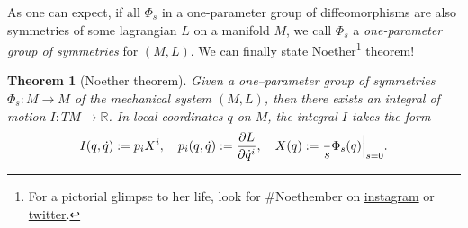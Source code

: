 \documentclass[english,fontsize=11pt,paper=a5,oneside]{scrbook}
\newcommand{\R}{\mathbb{R}}
\let\d\relax
\newcommand{\d}{\mathrm{d}}
\newtheorem{theorem}{Theorem}[chapter]
\theoremstyle{definition}
\begin{document}
As one can expect, if all $\Phi_s$ in a one-parameter group of diffeomorphisms are also symmetries of some lagrangian $L$ on a manifold $M$, we call $\Phi_s$ a \emph{one-parameter group of symmetries} for $(M,L)$. We can finally state Noether\footnote{For a pictorial glimpse to her life, look for \#Noethember on \href{https://www.instagram.com/explore/tags/noethember/}{instagram} or \href{https://twitter.com/search?q=noethember}{twitter}.} theorem!

\begin{theorem}[Noether theorem]\label{thm:noether}
  Given a one--parameter group of symmetries $\Phi_s: M \to M$ of the mechanical system $(M,L)$, then there exists an integral of motion $I: TM \to \R$.
  In local coordinates $q$ on $M$, the integral $I$ takes the form
  \begin{equation}
    I(q,\dot q) := p_i X^i,
    \quad p_i(q, \dot q) := \frac{\partial L}{\partial \dot q^i},
    \quad X(q) := \frac{\d}{\d s} \Phi_s(q) \Big|_{s=0}.
  \end{equation}
\end{theorem}
\end{document}
